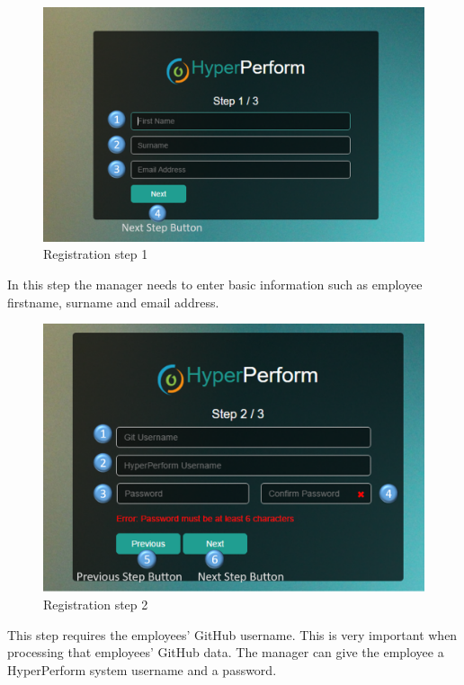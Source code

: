 \documentclass[11pt,a4paper]{article}
\begin{document}
\begin{figure}[H]
	\begin{center}
		\includegraphics[scale=0.35]{../Images/Getting_Started/Step_1_numbered}
		\caption{Registration step 1}
	\end{center}
\end{figure}

\noindent
In this step the manager needs to enter basic information such as employee firstname, surname and email address. 

\begin{figure}[H]
	\begin{center}
		\includegraphics[scale=0.35]{../Images/Getting_Started/Step_2_numbered}
		\caption{Registration step 2}
	\end{center}
\end{figure}

\noindent
This step requires the employees' GitHub username. This is very important when processing that employees' GitHub data. The manager can give the employee a HyperPerform system username and a password.
\end{document}
